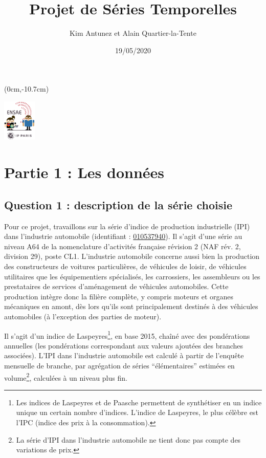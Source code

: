 \documentclass[french]{article}
\title{Projet de Séries Temporelles}
\author{Kim Antunez et Alain Quartier-la-Tente}
\date{19/05/2020}
\begin{document}
\maketitle

{
\hypersetup{linkcolor=}
\setcounter{tocdepth}{3}
\tableofcontents
}
\begin{textblock*}{\textwidth}(0cm,-10.7cm)
\begin{center}
\includegraphics[height=2cm]{img/LOGO-ENSAE-avatar.png}
\end{center}
\end{textblock*}

\thispagestyle{empty}
\newpage\setcounter{page}{1}

\hypertarget{partie-1-les-donnuxe9es}{%
\section{Partie 1 : Les données}\label{partie-1-les-donnuxe9es}}

\hypertarget{question-1-description-de-la-suxe9rie-choisie}{%
\subsection{Question 1 : description de la série choisie}\label{question-1-description-de-la-suxe9rie-choisie}}

Pour ce projet, travaillons sur la série d'indice de production industrielle (IPI) dans l'industrie automobile (identifiant : \href{https://bdm.insee.fr/series/sdmx/data/SERIES_BDM/010537940}{010537940}).
Il s'agit d'une série au niveau A64 de la nomenclature d'activités française révision 2 (NAF rév. 2, division 29), poste CL1.
L'industrie automobile concerne aussi bien la production des constructeurs de voitures particulières, de véhicules de loisir, de véhicules utilitaires que les équipementiers spécialisés, les carrossiers, les assembleurs ou les prestataires de services d'aménagement de véhicules automobiles.
Cette production intègre donc la filière complète, y compris moteurs et organes mécaniques en amont, dès lors qu'ils sont principalement destinés à des véhicules automobiles (à l'exception des parties de moteur).

Il s'agit d'un indice de Laspeyres\footnote{Les indices de Laspeyres et de Paasche permettent de synthétiser en un indice unique un certain nombre d'indices. L'indice de Laspeyres, le plus célèbre est l'IPC (indice des prix à la consommation).}, en base 2015, chaîné avec des pondérations annuelles (les pondérations correspondant aux valeurs ajoutées des branches associées).
L'IPI dans l'industrie automobile est calculé à partir de l'enquête mensuelle de branche, par agrégation de séries ``élémentaires'' estimées en volume\footnote{La série d'IPI dans l'industrie automobile ne tient donc pas compte des variations de prix.}, calculées à un niveau plus fin.
\end{document}
